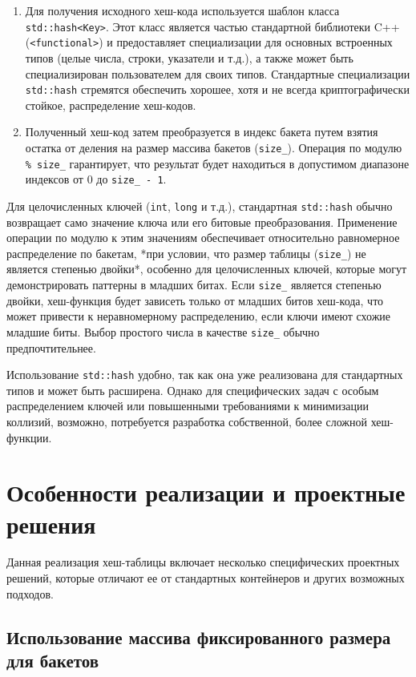 \documentclass[a4paper,12pt]{article}
\begin{document}
\begin{enumerate}
    \item Для получения исходного хеш-кода используется шаблон класса \texttt{std::hash<Key>}. Этот класс является частью стандартной библиотеки C++ (\texttt{<functional>}) и предоставляет специализации для основных встроенных типов (целые числа, строки, указатели и т.д.), а также может быть специализирован пользователем для своих типов. Стандартные специализации \texttt{std::hash} стремятся обеспечить хорошее, хотя и не всегда криптографически стойкое, распределение хеш-кодов.
    \item Полученный хеш-код затем преобразуется в индекс бакета путем взятия остатка от деления на размер массива бакетов (\texttt{size\_}). Операция по модулю \texttt{\% size\_} гарантирует, что результат будет находиться в допустимом диапазоне индексов от \(0\) до \texttt{size\_ - 1}.
\end{enumerate}

Для целочисленных ключей (\texttt{int}, \texttt{long} и т.д.), стандартная \texttt{std::hash} обычно возвращает само значение ключа или его битовые преобразования. Применение операции по модулю к этим значениям обеспечивает относительно равномерное распределение по бакетам, *при условии, что размер таблицы (\texttt{size\_}) не является степенью двойки*, особенно для целочисленных ключей, которые могут демонстрировать паттерны в младших битах. Если \texttt{size\_} является степенью двойки, хеш-функция будет зависеть только от младших битов хеш-кода, что может привести к неравномерному распределению, если ключи имеют схожие младшие биты. Выбор простого числа в качестве \texttt{size\_} обычно предпочтительнее.

Использование \texttt{std::hash} удобно, так как она уже реализована для стандартных типов и может быть расширена. Однако для специфических задач с особым распределением ключей или повышенными требованиями к минимизации коллизий, возможно, потребуется разработка собственной, более сложной хеш-функции.

\section{Особенности реализации и проектные решения}

Данная реализация хеш-таблицы включает несколько специфических проектных решений, которые отличают ее от стандартных контейнеров и других возможных подходов.

\subsection{Использование массива фиксированного размера для бакетов}
\end{document}
